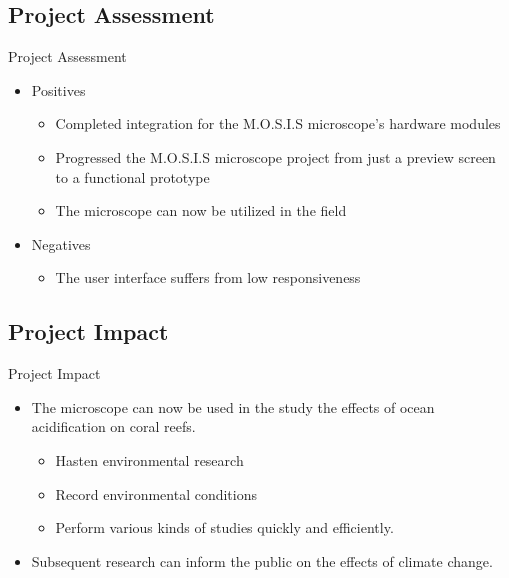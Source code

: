 \documentclass[17pt, aspectratio=169]{beamer}
\begin{document}
\subsection{Project Assessment}
\begin{frame}{Project Assessment}
	\begin{itemize}
		\item Positives
		      \begin{itemize}
			      \item Completed integration for the M.O.S.I.S microscope's hardware modules
			      \item Progressed the M.O.S.I.S microscope project from just a preview screen to a functional prototype
			      \item The microscope can now be utilized in the field
		      \end{itemize}
		\item Negatives
		      \begin{itemize}
			      \item The user interface suffers from low responsiveness
		      \end{itemize}
	\end{itemize}
\end{frame}
\subsection*{Project Impact}
\begin{frame}{Project Impact}
	\begin{itemize}
		\item The microscope can now be used in the study the effects of ocean acidification on coral reefs.
		      \begin{itemize}
			      \item Hasten environmental research
			      \item Record environmental conditions
			      \item Perform various kinds of studies quickly and efficiently.
		      \end{itemize}
		\item Subsequent research can inform the public on the effects of climate change.
	\end{itemize}
\end{frame}
\end{document}
